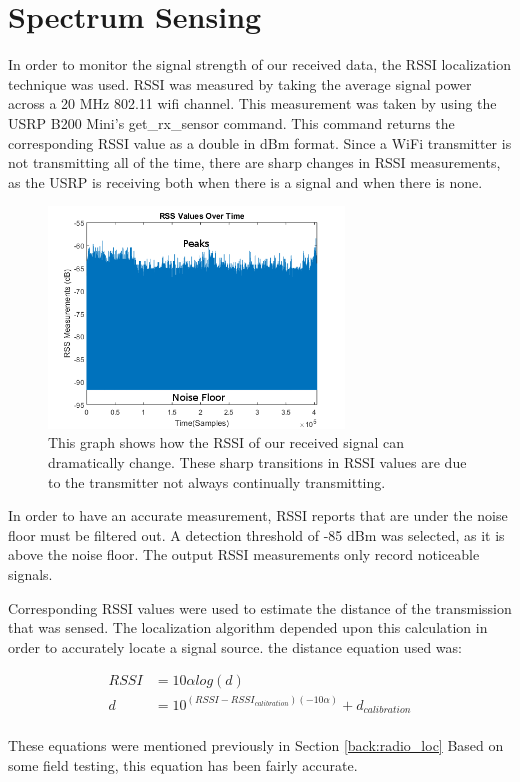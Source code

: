 \section{Spectrum Sensing}

In order to monitor the signal strength of our received data, the RSSI localization technique was used. RSSI was measured by taking the average signal power across a 20 MHz 802.11 wifi channel. This measurement was taken by using the USRP B200 Mini’s get\_rx\_sensor command.  This command returns the corresponding RSSI value as a double in dBm format.  Since a WiFi transmitter is not transmitting all of the time, there are sharp changes in RSSI measurements, as the USRP is receiving both when there is a signal and when there is none.

\begin{figure}[h!]
	\centering
	\includegraphics[width=0.70\textwidth]{img/rss_vals_test_labeled.png}
	\caption{This graph shows how the RSSI of our received signal can dramatically change.  These sharp transitions in RSSI values are due to the transmitter not always continually transmitting.}
	\label{fig:rss_values}
\end{figure}
In order to have an accurate measurement, RSSI reports that are under the noise floor must be filtered out. A detection threshold of -85 dBm was selected, as it is above the noise floor.  The output RSSI measurements only record noticeable signals.  

Corresponding RSSI values were used to estimate the distance of the transmission that was sensed.  The localization algorithm depended upon this calculation in order to accurately locate a signal source. the distance equation used was:

 \begin{align}
\label{eq:rss} RSSI &= 10\alpha log(d) \\ 
d &= 10^{(RSSI-RSSI_{calibration})(-10\alpha)} + d_{calibration} \label{eq:rss_dist}
\end{align}\\
These equations were mentioned previously in Section \ref{back:radio_loc}
Based on some field testing, this equation has been fairly accurate.\par

